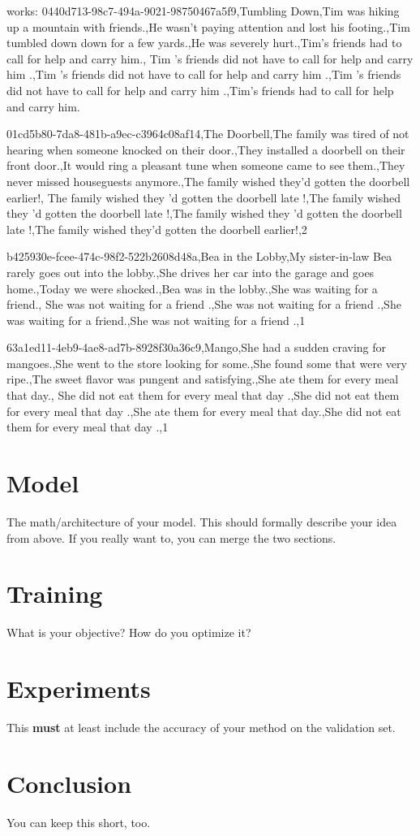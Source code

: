 \documentclass{article}
\begin{document}
works:
0440d713-98c7-494a-9021-98750467a5f9,Tumbling Down,Tim was hiking up a mountain with friends.,He wasn't paying attention and lost his footing.,Tim tumbled down down for a few yards.,He was severely hurt.,Tim's friends had to call for help and carry him., Tim 's friends did not have to call for help and carry him .,Tim 's friends did not have to call for help and carry him .,Tim 's friends did not have to call for help and carry him .,Tim's friends had to call for help and carry him.

01cd5b80-7da8-481b-a9ec-c3964c08af14,The Doorbell,The family was tired of not hearing when someone knocked on their door.,They installed a doorbell on their front door.,It would ring a pleasant tune when someone came to see them.,They never missed houseguests anymore.,The family wished they'd gotten the doorbell earlier!, The family wished they 'd gotten the doorbell late !,The family wished they 'd gotten the doorbell late !,The family wished they 'd gotten the doorbell late !,The family wished they'd gotten the doorbell earlier!,2


b425930e-fcee-474c-98f2-522b2608d48a,Bea in the Lobby,My sister-in-law Bea rarely goes out into the lobby.,She drives her car into the garage and goes home.,Today we were shocked.,Bea was in the lobby.,She was waiting for a friend., She was not waiting for a friend .,She was not waiting for a friend .,She was waiting for a friend.,She was not waiting for a friend .,1

63a1ed11-4eb9-4ae8-ad7b-8928f30a36c9,Mango,She had a sudden craving for mangoes.,She went to the store looking for some.,She found some that were very ripe.,The sweet flavor was pungent and satisfying.,She ate them for every meal that day., She did not eat them for every meal that day .,She did not eat them for every meal that day .,She ate them for every meal that day.,She did not eat them for every meal that day .,1
\section{Model}
The math/architecture of your model. This should formally describe your idea from above. If you really want to, you can merge the two sections.
\section{Training}
What is your objective? How do you optimize it?

\section{Experiments}
This {\bf must} at least include the accuracy of your method on the validation set.
\section{Conclusion}
You can keep this short, too.
\end{document}
